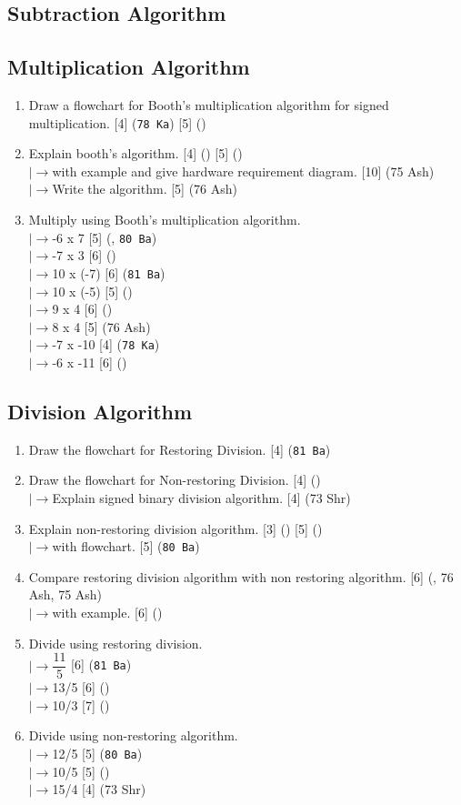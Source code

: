 \documentclass[12pt]{article}
\newcommand{\lb}{\\$\left|\rightarrow\right.$}
\begin{document}
	\subsection{Subtraction Algorithm}
	\subsection{Multiplication Algorithm}
		\begin{enumerate}[noitemsep, topsep=0pt]
			\item Draw a flowchart for Booth's multiplication algorithm for signed multiplication. \hfill [4] (\texttt{78 Ka}) [5] ()
			
			\item Explain booth's algorithm. \hfill [4] () [5] ()
			\lb with example and give hardware requirement diagram. \hfill [10] (75 Ash)
			\lb Write the algorithm. \hfill [5] (76 Ash)
			
			\item Multiply using Booth's multiplication algorithm.
				\lb -6 x 7 \hfill [5] (, \texttt{80 Ba})
				\lb -7 x 3 \hfill [6] ()
				\lb 10 x (-7) \hfill [6] (\texttt{81 Ba})
				\lb 10 x (-5) \hfill [5] ()
				\lb 9 x 4 \hfill [6] ()
				\lb 8 x 4 \hfill [5] (76 Ash)
				\lb -7 x -10 \hfill [4] (\texttt{78 Ka})
				\lb -6 x -11 \hfill [6] ()
		\end{enumerate}
	\subsection{Division Algorithm}
		\begin{enumerate}[noitemsep, topsep=0pt]
			\item Draw the flowchart for Restoring Division. \hfill [4] (\texttt{81 Ba})
			\item Draw the flowchart for Non-restoring Division. \hfill [4] ()
			\lb Explain signed binary division algorithm. \hfill [4] (73 Shr)
			
			\item Explain non-restoring division algorithm. \hfill [3] () [5] ()
			\lb with flowchart. \hfill [5] (\texttt{80 Ba})
			
			\item Compare restoring division algorithm with non restoring algorithm. \hfill [6] (, 76 Ash, 75 Ash)
			\lb with example. \hfill [6] ()
			
			\item Divide using restoring division. 
				\lb $\dfrac{11}{5}$ \hfill [6] (\texttt{81 Ba})
				\lb 13/5 \hfill [6] ()
				\lb 10/3 \hfill [7] ()

			\item Divide using non-restoring algorithm.
				\lb 12/5 \hfill [5] (\texttt{80 Ba})
				\lb 10/5 \hfill [5] ()
				\lb 15/4 \hfill [4] (73 Shr)
		\end{enumerate}
\end{document}
